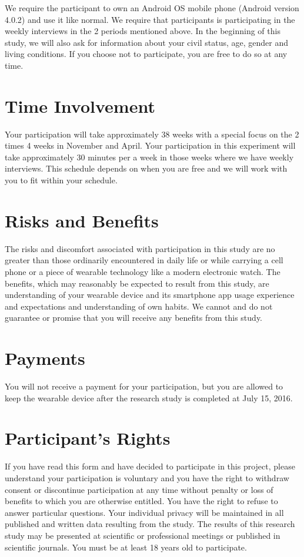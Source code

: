 \documentclass[12pt]{article}
\begin{document}
We require the participant to own an Android OS mobile phone (Android version 4.0.2) and use it like normal. We require that participants is participating in the weekly interviews in the 2 periods mentioned above. In the beginning of this study, we will also ask for information about your civil status, age, gender and living conditions. If you choose not to participate, you are free to do so at any time. 

\section{Time Involvement}
Your participation will take approximately 38 weeks with a special focus on the 2 times 4 weeks in November and April. Your participation in this experiment will take approximately 30 minutes per a week in those weeks where we have weekly interviews. This schedule depends on when you are free and we will work with you to fit within your schedule. 

\section{Risks and Benefits}
The risks and discomfort associated with participation in this study are no greater than those ordinarily encountered in daily life or while carrying a cell phone or a piece of wearable technology like a modern electronic watch. The benefits, which may reasonably be expected to result from this study, are understanding of your wearable device and its smartphone app usage experience and expectations and understanding of own habits. We cannot and do not guarantee or promise that you will receive any benefits from this study.

\section{Payments}
You will not receive a payment for your participation, but you are allowed to keep the wearable device after the research study is completed at July 15, 2016. 

\section{Participant's Rights}
If you have read this form and have decided to participate in this project, please understand your participation is voluntary and you have the right to withdraw consent or discontinue participation at any time without penalty or loss of benefits to which you are otherwise entitled. You have the right to refuse to answer particular questions. Your individual privacy will be maintained in all published and written data resulting from the study. The results of this research study may be presented at scientific or professional meetings or published in scientific journals. You must be at least 18 years old to participate.
\end{document}
